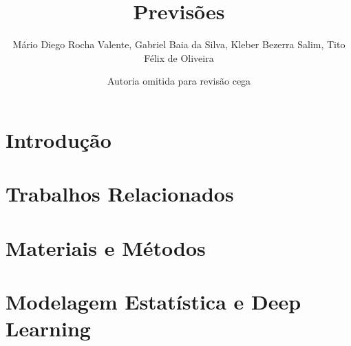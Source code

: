 \documentclass[12pt,a4paper]{article}
\title{Previsões}
\author{Mário Diego Rocha Valente\inst{1}, Gabriel Baia da Silva\inst{2},
Kleber Bezerra Salim\inst{1}, Tito Félix de Oliveira\inst{3}}
\author{Autoria omitida para revisão cega}
\begin{document}
\maketitle
\thispagestyle{empty}


\begin{abstract}

\end{abstract}

\begin{resumo}

\end{resumo}



\section{Introdução}



\section{Trabalhos Relacionados}



\section{Materiais e Métodos}



\section{Modelagem Estatística e Deep Learning}
\end{document}
